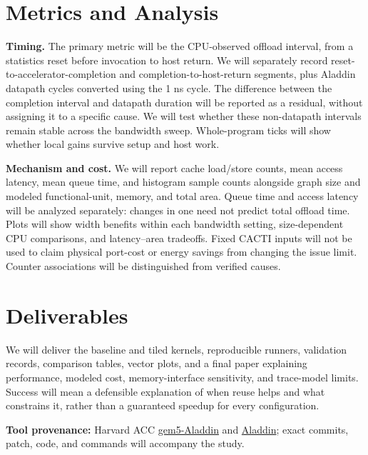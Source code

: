 \documentclass[10pt,letterpaper]{article}
\begin{document}
\section{Metrics and Analysis}
\textbf{Timing.} The primary metric will be the CPU-observed offload interval, from a statistics reset before invocation to host return. We will separately record reset-to-accelerator-completion and completion-to-host-return segments, plus Aladdin datapath cycles converted using the 1 ns cycle. The difference between the completion interval and datapath duration will be reported as a residual, without assigning it to a specific cause. We will test whether these non-datapath intervals remain stable across the bandwidth sweep. Whole-program ticks will show whether local gains survive setup and host work.

\textbf{Mechanism and cost.} We will report cache load/store counts, mean access latency, mean queue time, and histogram sample counts alongside graph size and modeled functional-unit, memory, and total area. Queue time and access latency will be analyzed separately: changes in one need not predict total offload time. Plots will show width benefits within each bandwidth setting, size-dependent CPU comparisons, and latency--area tradeoffs. Fixed CACTI inputs will not be used to claim physical port-cost or energy savings from changing the issue limit. Counter associations will be distinguished from verified causes.

\section{Deliverables}
We will deliver the baseline and tiled kernels, reproducible runners, validation records, comparison tables, vector plots, and a final paper explaining performance, modeled cost, memory-interface sensitivity, and trace-model limits. Success will mean a defensible explanation of when reuse helps and what constrains it, rather than a guaranteed speedup for every configuration.

\vfill
{\footnotesize\color{navy}\textbf{Tool provenance:} Harvard ACC \href{https://github.com/harvard-acc/gem5-aladdin}{gem5-Aladdin} and \href{https://github.com/harvard-acc/ALADDIN}{Aladdin}; exact commits, patch, code, and commands will accompany the study.}
\end{document}
